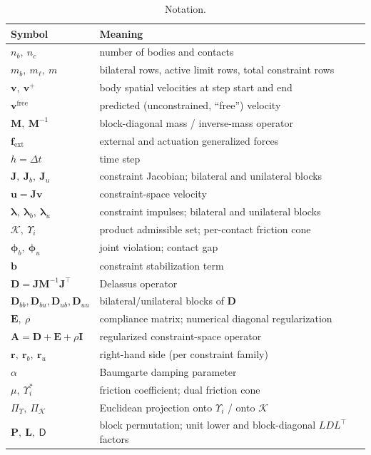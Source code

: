 \documentclass{article}
\newcommand{\M}{\mathbf{M}}
\newcommand{\Jac}{\mathbf{J}}
\newcommand{\Del}{\mathbf{D}}         %
\newcommand{\Ecomp}{\mathbf{E}}       %
\newcommand{\Aop}{\mathbf{A}}         %
\newcommand{\Perm}{\mathbf{P}}        %
\newcommand{\Lfac}{\mathbf{L}}        %
\newcommand{\Dfac}{\mathsf{D}}         %
\newcommand{\vv}{\mathbf{v}}
\newcommand{\vfree}{\mathbf{v}^{\mathrm{free}}}
\newcommand{\fext}{\mathbf{f}_{\mathrm{ext}}}
\newcommand{\blam}{\boldsymbol{\lambda}}
\newcommand{\bphi}{\boldsymbol{\phi}}
\newcommand{\rhs}{\mathbf{r}}
\newcommand{\cone}{\Upsilon}
\newcommand{\Kadm}{\mathcal{K}}          %
\newcommand{\proj}{\Pi_{\cone}}
\newcommand{\projK}{\Pi_{\Kadm}}
\newcommand{\uvel}{\mathbf{u}}           %
\newcommand{\stab}{\mathbf{b}}           %
\newcommand{\reg}{\rho}                  %
\newcommand{\Id}{\mathbf{I}}
\theoremstyle{plain}
\theoremstyle{definition}
\begin{document}
\begin{table}[h]
\centering
\begin{tabular}{@{}ll@{}}
\toprule
Symbol & Meaning \\
\midrule
$n_b,\ n_c$ & number of bodies and contacts \\
$m_b,\ m_\ell,\ m$ & bilateral rows, active limit rows, total constraint rows \\
$\vv,\ \vv^{+}$ & body spatial velocities at step start and end \\
$\vfree$ & predicted (unconstrained, ``free'') velocity \\
$\M,\ \M^{-1}$ & block-diagonal mass / inverse-mass operator \\
$\fext$ & external and actuation generalized forces \\
$h=\Delta t$ & time step \\
$\Jac,\ \Jac_b,\ \Jac_u$ & constraint Jacobian; bilateral and unilateral blocks \\
$\uvel=\Jac\vv$ & constraint-space velocity \\
$\blam,\ \blam_b,\ \blam_u$ & constraint impulses; bilateral and unilateral blocks \\
$\Kadm,\ \cone_i$ & product admissible set; per-contact friction cone \\
$\bphi_b,\ \bphi_u$ & joint violation; contact gap \\
$\stab$ & constraint stabilization term \\
$\Del=\Jac\M^{-1}\Jac^{\top}$ & Delassus operator \\
$\Del_{bb},\Del_{bu},\Del_{ub},\Del_{uu}$ & bilateral/unilateral blocks of $\Del$ \\
$\Ecomp,\ \reg$ & compliance matrix; numerical diagonal regularization \\
$\Aop=\Del+\Ecomp+\reg\Id$ & regularized constraint-space operator \\
$\rhs,\ \rhs_b,\ \rhs_u$ & right-hand side (per constraint family) \\
$\alpha$ & Baumgarte damping parameter \\
$\mu,\ \cone_i^{*}$ & friction coefficient; dual friction cone \\
$\proj,\ \projK$ & Euclidean projection onto $\cone_i$ / onto $\Kadm$ \\
$\Perm,\ \Lfac,\ \Dfac$ & block permutation; unit lower and block-diagonal $LDL^\top$ factors \\
\bottomrule
\end{tabular}
\caption{Notation.}
\label{tab:notation}
\end{table}
\end{document}

